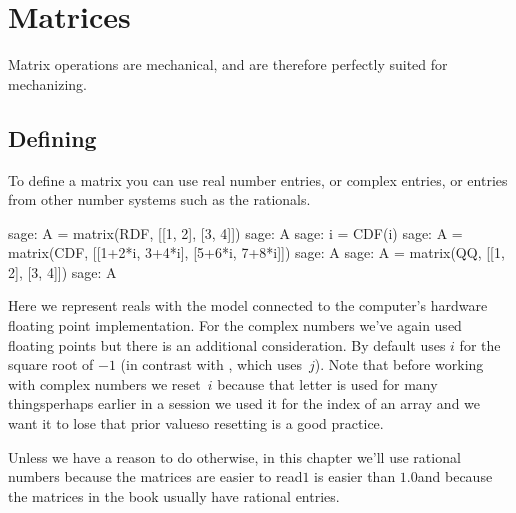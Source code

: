 \chapter{Matrices}

Matrix operations are mechanical, and are therefore perfectly suited for 
mechanizing.



\section{Defining}
To define a matrix 
you can use real number entries, or complex entries, or 
entries from other number systems such as the rationals. 
\begin{sagecommandline}
sage: A = matrix(RDF, [[1, 2], [3, 4]])
sage: A
sage: i = CDF(i)
sage: A = matrix(CDF, [[1+2*i, 3+4*i], [5+6*i, 7+8*i]])
sage: A
sage: A = matrix(QQ, [[1, 2], [3, 4]])
sage: A                           
\end{sagecommandline}
\noindent
Here we represent reals with the model connected to the computer's hardware
floating point implementation. 
For the complex
numbers we've again 
used floating points but there is an additional consideration.
By default \Sage{} uses $i$ for the square root of $-1$ (in contrast with 
\python, which uses~$j$).
Note that before working with complex numbers we reset~$i$ 
because that letter is used for many things\Dash perhaps earlier in 
a session we used it for the index of an array and we want it to lose that
prior value\Dash so 
resetting is a good practice.

Unless we have a reason to do otherwise, in this chapter
we'll use rational numbers because the matrices are easier to 
read\Dash $1$ is easier than $1.0$\Dash and 
because the matrices in the book usually have rational entries.

